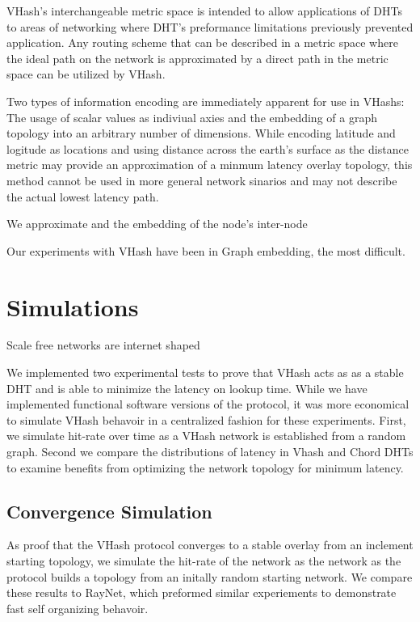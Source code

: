\documentclass{IEEEtran}
\begin{document}
VHash's interchangeable metric space is intended to allow applications of DHTs to areas of networking where DHT's preformance limitations previously prevented application.
Any routing scheme that can be described in a metric space where the ideal path on the network is approximated by a direct path in the metric space can be utilized by VHash.


Two types of information encoding are immediately apparent for use in VHashs: The usage of scalar values as indiviual axies and the embedding of a graph topology into an arbitrary number of dimensions.
While encoding latitude and logitude as locations and using distance across the earth's surface as the distance metric may provide an approximation of a minmum latency overlay topology, this method cannot be used in more general network sinarios and may not describe the actual lowest latency path.

We approximate and the embedding of the node's inter-node 

Our experiments with VHash have been in Graph embedding, the most difficult.




\section{Simulations}
Scale free networks are internet shaped\cite{cohen2000resilience}

We implemented two experimental tests to prove that VHash acts as as a stable DHT and is able to minimize the latency on lookup time.
While we have implemented functional software versions of the protocol, it was more economical to simulate VHash behavoir in a centralized fashion for these experiments.
First, we simulate hit-rate over time as a VHash network is established from a random graph.
Second we compare the distributions of latency in Vhash and Chord DHTs to examine benefits from optimizing the network topology for minimum latency.

\subsection{Convergence Simulation}
As proof that the VHash protocol converges to a stable overlay from an inclement starting topology, we simulate the hit-rate of the network as the network as the protocol builds a topology from an initally random starting network.
We compare these results to RayNet, which preformed similar experiements to demonstrate fast self organizing behavoir.
\end{document}
